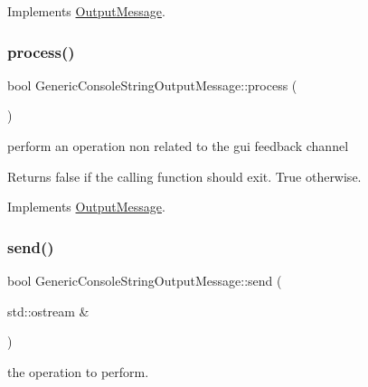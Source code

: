 Implements \mbox{\hyperlink{class_output_message_adfc965910862cd236e437e3050aee176}{Output\+Message}}.

\mbox{\label{class_generic_console_string_output_message_a89a8f1a84f56aac8d98984d552095155}} 
\subsubsection{\texorpdfstring{process()}{process()}}
{\footnotesize\ttfamily bool Generic\+Console\+String\+Output\+Message\+::process (\begin{DoxyParamCaption}{ }\end{DoxyParamCaption})\hspace{0.3cm}{\ttfamily [virtual]}}



perform an operation non related to the gui feedback channel 

\begin{DoxyReturn}{Returns}
false if the calling function should exit. True otherwise. 
\end{DoxyReturn}


Implements \mbox{\hyperlink{class_output_message_a949d8350d98202608e4248fe6dafa10f}{Output\+Message}}.

\mbox{\label{class_generic_console_string_output_message_afd9c18543844626cb07d800e9f8b43a6}} 
\subsubsection{\texorpdfstring{send()}{send()}}
{\footnotesize\ttfamily bool Generic\+Console\+String\+Output\+Message\+::send (\begin{DoxyParamCaption}\item[{std\+::ostream \&}]{ }\end{DoxyParamCaption})\hspace{0.3cm}{\ttfamily [virtual]}}



the operation to perform. 

